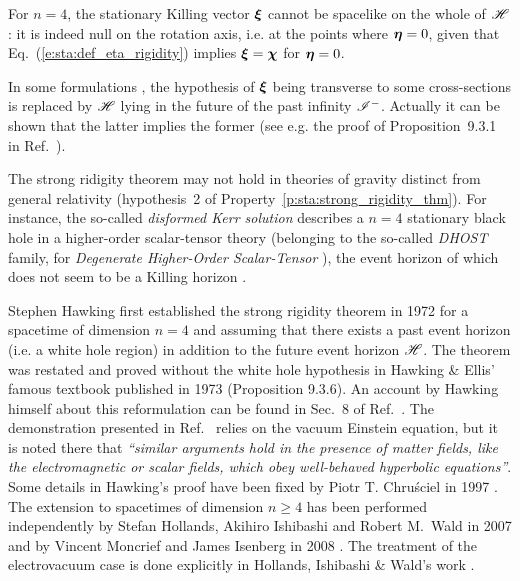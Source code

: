 \begin{remark}
For $n=4$, the stationary Killing vector $\bm{\xi}$ cannot be spacelike
on the whole of $\mathscr{H}$: it is indeed null on the rotation axis, i.e.
at the points where $\bm{\eta} = 0$, given that Eq.~(\ref{e:sta:def_eta_rigidity})
implies $\bm{\xi} = \bm{\chi}$ for $\bm{\eta}=0$.
\end{remark}

\begin{remark}
In some formulations \cite{HollaIW07,HawkiE73}, the hypothesis of $\bm{\xi}$
being transverse to some cross-sections is replaced by $\mathscr{H}$ lying in
the future of the past infinity $\mathscr{I}^-$. Actually it can be shown
that the latter implies the former (see e.g. the proof of Proposition~9.3.1
in Ref.~\cite{HawkiE73}).
\end{remark}

\begin{remark} \label{r:sta:non_Killing}
The strong ridigity theorem may not hold in theories of gravity distinct
from general relativity (hypothesis~2 of Property~\ref{p:sta:strong_rigidity_thm}).
For instance, the so-called \emph{disformed Kerr solution}
\cite{AnsonBCH21,BenAc_al20}
describes a $n=4$ stationary black hole in a higher-order scalar-tensor theory (belonging to the
so-called \emph{DHOST} family, for \emph{Degenerate Higher-Order Scalar-Tensor} \cite{Langl19}), the event horizon of which does not seem to be a Killing horizon
\cite{AnsonBCH21}.
\end{remark}


\begin{hist}
Stephen Hawking first established the strong rigidity
theorem in 1972 \cite{Hawki72}
for a spacetime of dimension $n=4$ and assuming that there exists
a past event horizon (i.e. a white hole region) in addition to the
future event horizon $\mathscr{H}$.
The theorem was restated and proved without the white hole hypothesis
in Hawking \& Ellis' famous textbook published in 1973 \cite{HawkiE73}
(Proposition 9.3.6).
An account by Hawking himself
about this reformulation can be found in
Sec.~8 of Ref.~\cite{Hawki73}. The demonstration presented in Ref.~\cite{HawkiE73}
relies on the vacuum Einstein equation,
but it is noted there that \emph{``similar arguments hold in the presence
of matter fields, like the electromagnetic or scalar fields, which obey
well-behaved hyperbolic equations''}.
Some details in Hawking's proof have been fixed
by Piotr T. Chru\'sciel in 1997 \cite{Chrus97}.
The extension to spacetimes of
dimension $n\geq 4$ has been performed independently by
Stefan Hollands, Akihiro Ishibashi
and Robert M.~Wald in 2007 \cite{HollaIW07}
and by Vincent Moncrief and James Isenberg
in 2008 \cite{MoncrI08}. The treatment of the electrovacuum
case is done explicitly in Hollands, Ishibashi \& Wald's work \cite{HollaIW07}.
\end{hist}

